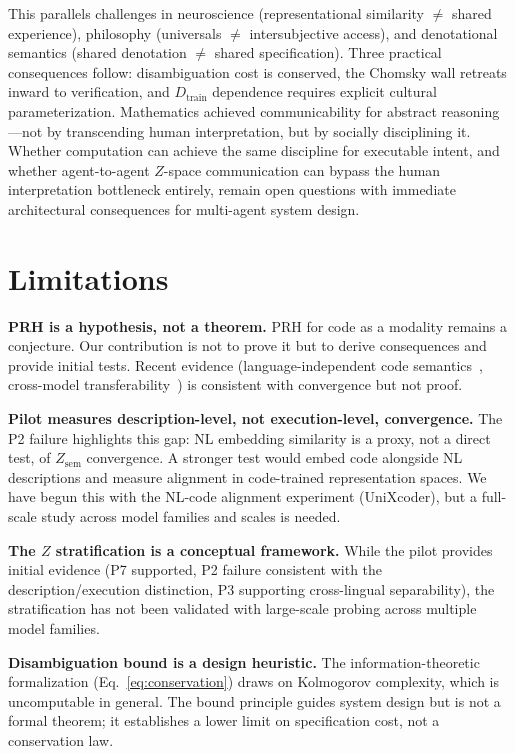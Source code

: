 \documentclass[11pt]{article}
\theoremstyle{definition}
\newcommand{\Zsem}{Z_{\text{sem}}}
\newcommand{\Dtrain}{D_{\text{train}}}
\begin{document}
This parallels challenges in neuroscience (representational similarity $\neq$ shared experience), philosophy (universals $\neq$ intersubjective access), and denotational semantics (shared denotation $\neq$ shared specification). Three practical consequences follow: disambiguation cost is conserved, the Chomsky wall retreats inward to verification, and $\Dtrain$ dependence requires explicit cultural parameterization. Mathematics achieved communicability for abstract reasoning---not by transcending human interpretation, but by socially disciplining it. Whether computation can achieve the same discipline for executable intent, and whether agent-to-agent $Z$-space communication can bypass the human interpretation bottleneck entirely, remain open questions with immediate architectural consequences for multi-agent system design.


\section*{Limitations}

\textbf{PRH is a hypothesis, not a theorem.} PRH for code as a modality remains a conjecture. Our contribution is not to prove it but to derive consequences and provide initial tests. Recent evidence (language-independent code semantics~\cite{beyondsyntax2025}, cross-model transferability~\cite{chen2025crossmodel}) is consistent with convergence but not proof.

\textbf{Pilot measures description-level, not execution-level, convergence.} The P2 failure highlights this gap: NL embedding similarity is a proxy, not a direct test, of $\Zsem$ convergence. A stronger test would embed code alongside NL descriptions and measure alignment in code-trained representation spaces. We have begun this with the NL-code alignment experiment (UniXcoder), but a full-scale study across model families and scales is needed.

\textbf{The $Z$ stratification is a conceptual framework.} While the pilot provides initial evidence (P7 supported, P2 failure consistent with the description/execution distinction, P3 supporting cross-lingual separability), the stratification has not been validated with large-scale probing across multiple model families.

\textbf{Disambiguation bound is a design heuristic.} The information-theoretic formalization (Eq.~\ref{eq:conservation}) draws on Kolmogorov complexity, which is uncomputable in general. The bound principle guides system design but is not a formal theorem; it establishes a lower limit on specification cost, not a conservation law.
\end{document}
